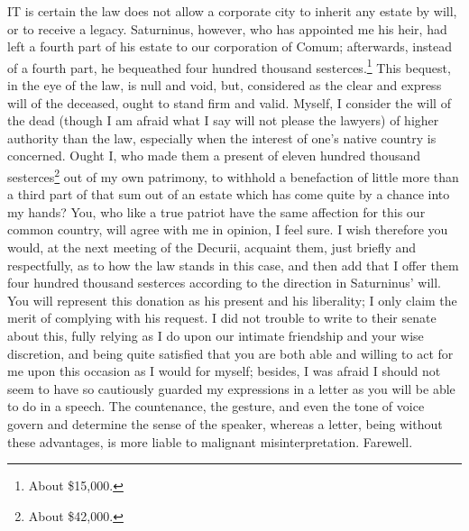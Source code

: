 IT is certain the law does not allow a corporate city to inherit any
estate by will, or to receive a legacy. Saturninus, however, who has
appointed me his heir, had left a fourth part of his estate to our
corporation of Comum; afterwards, instead of a fourth part, he bequeathed
four hundred thousand sesterces.\footnote{About \$15,000.} This bequest, in the
eye of the law, is null and void, but, considered as the clear and express
will of the deceased, ought to stand firm and valid. Myself, I consider
the will of the dead (though I am afraid what I say will not please the
lawyers) of higher authority than the law, especially when the interest of
one's native country is concerned. Ought I, who made them a present of
eleven hundred thousand sesterces\footnote{About \$42,000.} out of my own
patrimony, to withhold a benefaction of little more than a third part of
that sum out of an estate which has come quite by a chance into my hands?
You, who like a true patriot have the same affection for this our common
country, will agree with me in opinion, I feel sure. I wish therefore you
would, at the next meeting of the Decurii, acquaint them, just briefly and
respectfully, as to how the law stands in this case, and then add that I
offer them four hundred thousand sesterces according to the direction in
Saturninus' will. You will represent this donation as his present and his
liberality; I only claim the merit of complying with his request. I did
not trouble to write to their senate about this, fully relying as I do
upon our intimate friendship and your wise discretion, and being quite
satisfied that you are both able and willing to act for me upon this
occasion as I would for myself; besides, I was afraid I should not seem to
have so cautiously guarded my expressions in a letter as you will be able
to do in a speech. The countenance, the gesture, and even the tone of
voice govern and determine the sense of the speaker, whereas a letter,
being without these advantages, is more liable to malignant
misinterpretation. Farewell.


